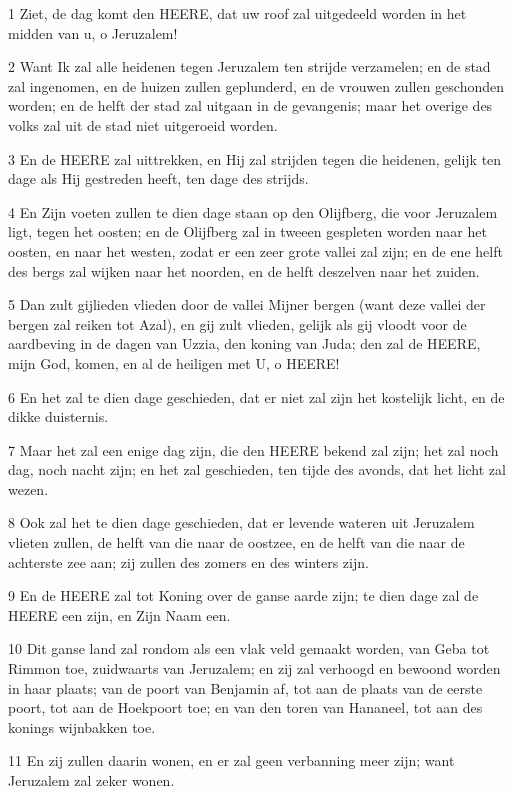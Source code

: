 \par 1 Ziet, de dag komt den HEERE, dat uw roof zal uitgedeeld worden in het midden van u, o Jeruzalem!
\par 2 Want Ik zal alle heidenen tegen Jeruzalem ten strijde verzamelen; en de stad zal ingenomen, en de huizen zullen geplunderd, en de vrouwen zullen geschonden worden; en de helft der stad zal uitgaan in de gevangenis; maar het overige des volks zal uit de stad niet uitgeroeid worden.
\par 3 En de HEERE zal uittrekken, en Hij zal strijden tegen die heidenen, gelijk ten dage als Hij gestreden heeft, ten dage des strijds.
\par 4 En Zijn voeten zullen te dien dage staan op den Olijfberg, die voor Jeruzalem ligt, tegen het oosten; en de Olijfberg zal in tweeen gespleten worden naar het oosten, en naar het westen, zodat er een zeer grote vallei zal zijn; en de ene helft des bergs zal wijken naar het noorden, en de helft deszelven naar het zuiden.
\par 5 Dan zult gijlieden vlieden door de vallei Mijner bergen (want deze vallei der bergen zal reiken tot Azal), en gij zult vlieden, gelijk als gij vloodt voor de aardbeving in de dagen van Uzzia, den koning van Juda; den zal de HEERE, mijn God, komen, en al de heiligen met U, o HEERE!
\par 6 En het zal te dien dage geschieden, dat er niet zal zijn het kostelijk licht, en de dikke duisternis.
\par 7 Maar het zal een enige dag zijn, die den HEERE bekend zal zijn; het zal noch dag, noch nacht zijn; en het zal geschieden, ten tijde des avonds, dat het licht zal wezen.
\par 8 Ook zal het te dien dage geschieden, dat er levende wateren uit Jeruzalem vlieten zullen, de helft van die naar de oostzee, en de helft van die naar de achterste zee aan; zij zullen des zomers en des winters zijn.
\par 9 En de HEERE zal tot Koning over de ganse aarde zijn; te dien dage zal de HEERE een zijn, en Zijn Naam een.
\par 10 Dit ganse land zal rondom als een vlak veld gemaakt worden, van Geba tot Rimmon toe, zuidwaarts van Jeruzalem; en zij zal verhoogd en bewoond worden in haar plaats; van de poort van Benjamin af, tot aan de plaats van de eerste poort, tot aan de Hoekpoort toe; en van den toren van Hananeel, tot aan des konings wijnbakken toe.
\par 11 En zij zullen daarin wonen, en er zal geen verbanning meer zijn; want Jeruzalem zal zeker wonen.
